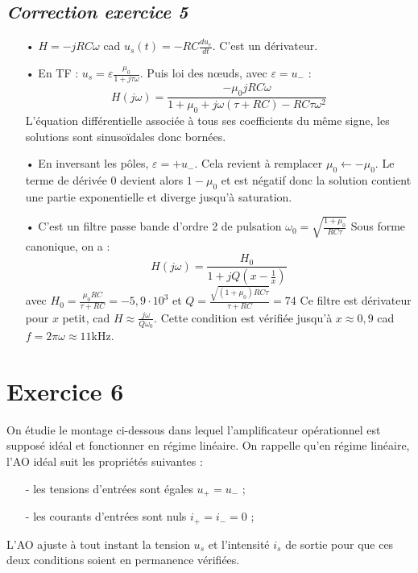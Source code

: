 \documentclass{report}
\begin{document}
\newpage

\subsection*{\textit{Correction exercice 5}}

\begin{itemize}
	\item[•] $H = -jRC\omega$ cad $u_s(t) = -RC\frac{du_e}{dt}$. C'est un dérivateur.
	\item[•] En TF : $u_s = \varepsilon\frac{\mu_0}{1+j\tau\omega}$. Puis loi des nœuds, avec $\varepsilon=u_-$ :
	\begin{equation}
		H(j\omega) = \frac{-\mu_0jRC\omega}{1+\mu_0 + j\omega(\tau+RC)-RC\tau\omega^2}
	\end{equation}
	L'équation différentielle associée à tous ses coefficients du même signe, les solutions sont sinusoïdales donc bornées. 
	\item[•] En inversant les pôles, $\varepsilon=+u_-$. Cela revient à remplacer $\mu_0\leftarrow-\mu_0$. Le terme de dérivée 0 devient alors $1-\mu_0$ et est négatif donc la solution contient une partie exponentielle et diverge jusqu'à saturation.
	\item[•] C'est un filtre passe bande d'ordre 2 de pulsation $\omega_0=\sqrt{\frac{1+\mu_0}{RC\tau}}$
	Sous forme canonique, on a :
		\begin{equation}
		H(j\omega) = \frac{H_0}{1+jQ(x-\frac{1}{x})}
	\end{equation}
	avec $H_0=\frac{\mu_0RC}{\tau+RC}=-5,9\cdot10^3$ et $Q = \frac{\sqrt{(1+\mu_0)RC\tau}}{\tau+RC}=74$
	Ce filtre est dérivateur pour $x$ petit, cad $H\approx \frac{j\omega}{Q\omega_0}$. Cette condition est vérifiée jusqu'à $x\approx0,9$ cad $f=2\pi\omega\approx11$kHz.
\end{itemize}

\newpage

\section*{Exercice 6}

On étudie le montage ci-dessous dans lequel l'amplificateur opérationnel est supposé idéal et fonctionner en régime linéaire. On rappelle qu'en régime linéaire, l'AO idéal suit les propriétés suivantes :
\begin{itemize}
	\item[-] les tensions d'entrées sont égales $u_+=u_-$ ;
	\item[-] les courants d'entrées sont nuls $i_+=i_-=0$ ;
\end{itemize}
L'AO ajuste à tout instant la tension $u_s$ et l'intensité $i_s$ de sortie pour que ces deux conditions soient en permanence vérifiées.
\end{document}
